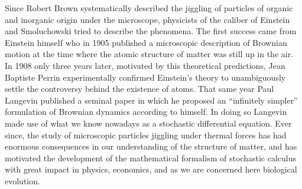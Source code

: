 Since Robert Brown systematically described the jiggling of particles of
organic and inorganic origin under the microscope, physicists of the caliber of
Einstein and Smoluchowski tried to describe the phenomena. The first success
came from Einstein himself who in 1905 published a microscopic description of
Brownian motion at the time where the atomic structure of matter was still up
in the air. In 1908 only three years later, motivated by this theoretical
predictions, Jean Baptiste Perrin experimentally confirmed Einstein's theory to
unambiguously settle the controversy behind the existence of atoms. That same
year Paul Langevin published a seminal paper in which he proposed an
``infinitely simpler'' formulation of Brownian dynamics according to himself.
In doing so Langevin made use of what we know nowadays as a stochastic
differential equation. Ever since, the study of microscopic particles jiggling
under thermal forces has had enormous consequences in our understanding of the
structure of matter, and has motivated the development of the mathematical
formalism of stochastic calculus with great impact in physics, economics, and
as we are concerned here biological evolution.

